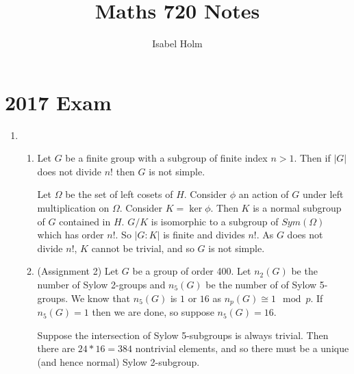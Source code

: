 \documentclass[]{article}
\title{Maths 720 Notes}
\author{Isabel Holm}
\begin{document}
	\section{2017 Exam}
	\begin{enumerate}
		\item \begin{enumerate}
			\item Let $G$ be a finite group with a subgroup of finite index $n>1$. Then if $|G|$ does not divide $n!$ then $G$ is not simple.
			
			Let $\Omega$ be the set of left cosets of $H$. Consider $\phi$ an action of $G$ under left multiplication on $\Omega$. Consider $K=\ker\phi$. Then $K$ is a normal subgroup of $G$ contained in $H$. $G/K$ is isomorphic to a subgroup of $Sym(\Omega)$ which has order $n!$. So $|G:K|$ is finite and divides $n!$. As $G$ does not divide $n!$, $K$ cannot be trivial, and so $G$ is not simple. 
			\item (Assignment 2) Let $G$ be a group of order 400. Let $n_2(G)$ be the number of Sylow 2-groups and $n_5(G)$ be the number of of Sylow 5-groups. We know that $n_5(G)$ is $1$ or $16$ as $n_p(G)\cong 1\mod p$. If $n_5(G)=1$ then we are done, so suppose $n_5(G)=16$.
			
			Suppose the intersection of Sylow 5-subgroups is always trivial. Then there are $24*16=384$ nontrivial elements, and so there must be a unique (and hence normal) Sylow 2-subgroup.
			

\end{enumerate}
\end{enumerate}
\end{document}
